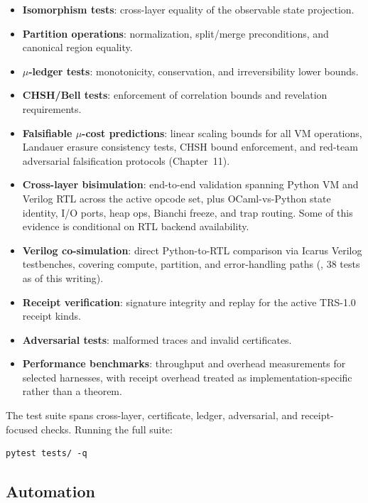 \begin{itemize}
    \item \textbf{Isomorphism tests}: cross-layer equality of the observable state projection.
    \item \textbf{Partition operations}: normalization, split/merge preconditions, and canonical region equality.
    \item \textbf{$\mu$-ledger tests}: monotonicity, conservation, and irreversibility lower bounds.
    \item \textbf{CHSH/Bell tests}: enforcement of correlation bounds and revelation requirements.
    \item \textbf{Falsifiable $\mu$-cost predictions}: linear scaling bounds for all VM operations, Landauer erasure consistency tests, CHSH bound enforcement, and red-team adversarial falsification protocols (Chapter~11).
    \item \textbf{Cross-layer bisimulation}: end-to-end validation spanning Python VM and Verilog RTL across the active opcode set, plus OCaml-vs-Python state identity, I/O ports, heap ops, Bianchi freeze, and trap routing. Some of this evidence is conditional on RTL backend availability.
    \item \textbf{Verilog co-simulation}: direct Python-to-RTL comparison via Icarus Verilog testbenches, covering compute, partition, and error-handling paths (, 38 tests as of this writing).
    \item \textbf{Receipt verification}: signature integrity and replay for the active TRS-1.0 receipt kinds.
    \item \textbf{Adversarial tests}: malformed traces and invalid certificates.
    \item \textbf{Performance benchmarks}: throughput and overhead measurements for selected harnesses, with receipt overhead treated as implementation-specific rather than a theorem.
\end{itemize}

The test suite spans cross-layer, certificate, ledger, adversarial, and receipt-focused checks. Running the full suite:

\begin{lstlisting}
pytest tests/ -q
\end{lstlisting}

\subsection{Automation}

